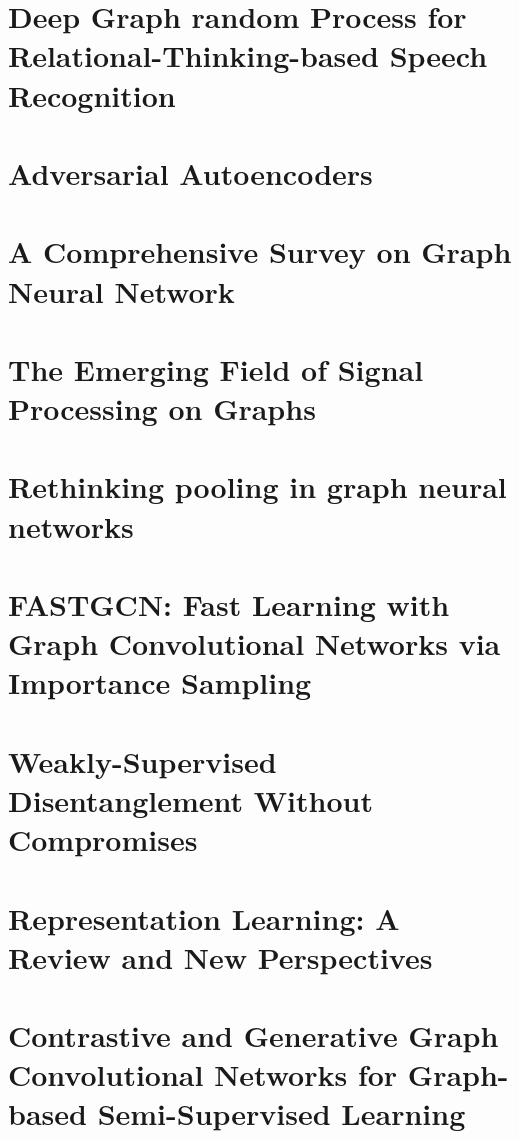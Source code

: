 \documentclass[a4paper,table]{article}
\begin{document}
\section{Deep Graph random Process for Relational-Thinking-based Speech Recognition}


\section{Adversarial Autoencoders}


\section{A Comprehensive Survey on Graph Neural Network}



\section{The Emerging Field of Signal Processing on Graphs}


\section{Rethinking pooling in graph neural networks}


\section{FASTGCN: Fast Learning with Graph Convolutional Networks via Importance Sampling}


\section{Weakly-Supervised Disentanglement Without Compromises}


\section{Representation Learning: A Review and New Perspectives}


\section{Contrastive and Generative Graph Convolutional Networks for Graph-based Semi-Supervised Learning}

\end{document}
